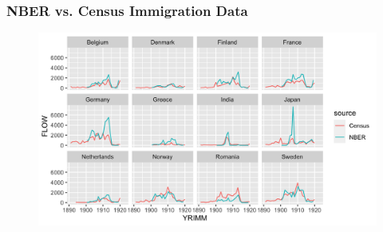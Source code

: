 \documentclass[pdf]{beamer}
\begin{document}
\appendix

\begin{frame}[label = flow_compar_all]
	\frametitle{NBER vs. Census Immigration Data}
    \centering
	\begin{figure}[H]
		\begin{center}
			\includegraphics[width=\textwidth]{../../figs/8aug23/nber_census_compare_all.png}
		\end{center}
	\end{figure}
    \hyperlink{data1}{}
\end{frame}
\end{document}
